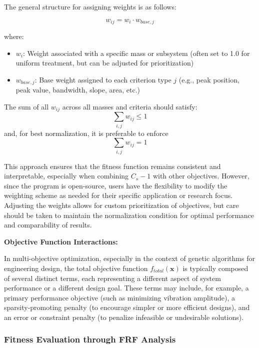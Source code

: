 \documentclass[12pt,a4paper]{article}
\begin{document}
The general structure for assigning weights is as follows:

\begin{equation}\label{Eq.weight_hierarchy_detailed}
w_{ij} = w_i \cdot w_{base,j}
\end{equation}

where:
\begin{itemize}
    \item $w_i$: Weight associated with a specific mass or subsystem (often set to 1.0 for uniform treatment, but can be adjusted for prioritization)
    \item $w_{base,j}$: Base weight assigned to each criterion type $j$ (e.g., peak position, peak value, bandwidth, slope, area, etc.)
\end{itemize}

The sum of all $w_{ij}$ across all masses and criteria should satisfy:
\begin{equation}
\sum_{i,j} w_{ij} \leq 1
\end{equation}
and, for best normalization, it is preferable to enforce
\begin{equation}
\sum_{i,j} w_{ij} = 1
\end{equation}

This approach ensures that the fitness function remains consistent and interpretable, especially when combining $C_s - 1$ with other objectives. However, since the program is open-source, users have the flexibility to modify the weighting scheme as needed for their specific application or research focus. Adjusting the weights allows for custom prioritization of objectives, but care should be taken to maintain the normalization condition for optimal performance and comparability of results.

\textbf{Objective Function Interactions:} 

In multi-objective optimization, especially in the context of genetic algorithms for engineering design, the total objective function $f_{total}(\mathbf{x})$ is typically composed of several distinct terms, each representing a different aspect of system performance or a different design goal. These terms may include, for example, a primary performance objective (such as minimizing vibration amplitude), a sparsity-promoting penalty (to encourage simpler or more efficient designs), and an error or constraint penalty (to penalize infeasible or undesirable solutions).


\subsubsection{Fitness Evaluation through FRF Analysis}
\end{document}
